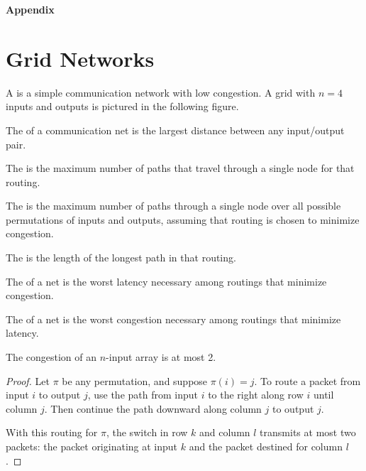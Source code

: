 \documentclass[quiz]{mcs}
\begin{document}

\examspace

\begin{center}
\LARGE \textbf{Appendix}
\end{center}

\iffalse
\section{Grid Networks}

A  is a simple communication network with low congestion.  A
grid with $n = 4$ inputs and outputs is pictured in the following figure.


The  of a communication net is the largest distance between
any input/output pair.

The  is the maximum number of paths that
travel through a single node for that routing.

The  is the maximum number of paths through a
single node over all possible permutations of inputs and outputs, assuming
that routing is chosen to minimize congestion.

The  is the length of the longest path in that
routing.
 
The  of a net is the worst
latency necessary among routings that minimize congestion.

The  of a net is the worst
congestion necessary among routings that minimize latency.

\begin{theorem*} 
The congestion of an $n$-input array is at most 2. 
\end{theorem*} 
 
\begin{proof} 
  Let $\pi$ be any permutation, and suppose $\pi(i)=j$.  To route a packet 
  from input $i$ to output $j$, use the path from input $i$ to the right 
  along row $i$ until column $j$.  Then continue the path downward along 
  column $j$ to output $j$. 
 
  With this routing for $\pi$, the switch in row $k$ and column $l$ 
  transmits at most two packets: the packet originating at input $k$ and 
  the packet destined for column $l$. 
\end{proof} 
\end{document}
